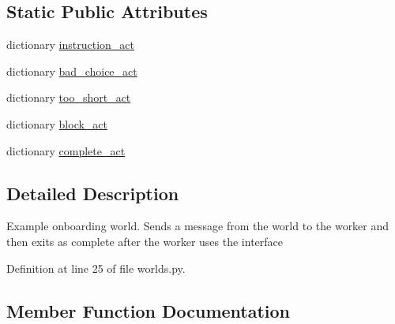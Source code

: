 \subsection*{Static Public Attributes}
\begin{DoxyCompactItemize}
\item 
dictionary \hyperlink{classlight__chats_1_1worlds_1_1LightChatOnboardingWorld_aa32ca75831c73dae0407cd74dc63e4df}{instruction\+\_\+act}
\item 
dictionary \hyperlink{classlight__chats_1_1worlds_1_1LightChatOnboardingWorld_a6815f9e8e89c92ca5496451dc6c59584}{bad\+\_\+choice\+\_\+act}
\item 
dictionary \hyperlink{classlight__chats_1_1worlds_1_1LightChatOnboardingWorld_a5b2b58ba5374d0ef950bd3c0298085c7}{too\+\_\+short\+\_\+act}
\item 
dictionary \hyperlink{classlight__chats_1_1worlds_1_1LightChatOnboardingWorld_a5dabed94efc09ac9a18be394756f6cdc}{block\+\_\+act}
\item 
dictionary \hyperlink{classlight__chats_1_1worlds_1_1LightChatOnboardingWorld_a8a829ffc9441313b2934f656f8632fc7}{complete\+\_\+act}
\end{DoxyCompactItemize}


\subsection{Detailed Description}
\begin{DoxyVerb}Example onboarding world. Sends a message from the world to the
worker and then exits as complete after the worker uses the interface
\end{DoxyVerb}
 

Definition at line 25 of file worlds.\+py.



\subsection{Member Function Documentation}
\mbox{\label{classlight__chats_1_1worlds_1_1LightChatOnboardingWorld_a0f913f08e74b21ad1d6b04c302e38850}} 
